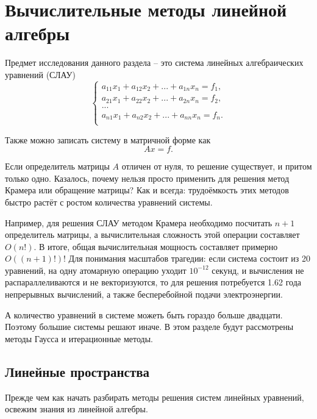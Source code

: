 \documentclass{article}
\begin{document}
\section{Вычислительные методы линейной алгебры}
Предмет исследования данного раздела -- это система линейных алгебраических
уравнений (СЛАУ)
\[
	\begin{cases}
		a_{11}x_1+a_{12}x_2+...+a_{1n}x_n=f_1, \\
		a_{21}x_1+a_{22}x_2+...+a_{2n}x_n=f_2, \\
		... \\
		a_{n1}x_1+a_{n2}x_2+...+a_{nn}x_n=f_n. \\
	\end{cases}
\]

Также можно записать систему в матричной форме как
\[Ax=f.\]

Если определитель матрицы $A$ отличен от нуля, то решение существует, и притом
только одно. Казалось, почему нельзя просто применить для решения метод Крамера
или обращение матрицы? Как и всегда: трудоёмкость этих методов быстро растёт с
ростом количества уравнений системы.

Например, для решения СЛАУ методом Крамера необходимо посчитать $n+1$
определитель матрицы, а вычислительная сложность этой операции составляет
$O(n!)$. В итоге, общая вычислительная мощность составляет примерно $O((n+1)!)$!
Для понимания масштабов трагедии: если система состоит из 20 уравнений, на
одну атомарную операцию уходит $10^{-12}$ секунд, и вычисления не
распараллеливаются и не векторизуются, то для решения потребуется 1.62 года
непрерывных вычислений, а также бесперебойной подачи электроэнергии.

А количество уравнений в системе можеть быть гораздо больше двадцати. Поэтому
большие системы решают иначе. В этом разделе будут рассмотрены методы Гаусса и
итерационные методы.

\newpage

\subsection{Линейные пространства}
Прежде чем как начать разбирать методы решения систем линейных уравнений,
освежим знания из линейной алгебры.
\end{document}
